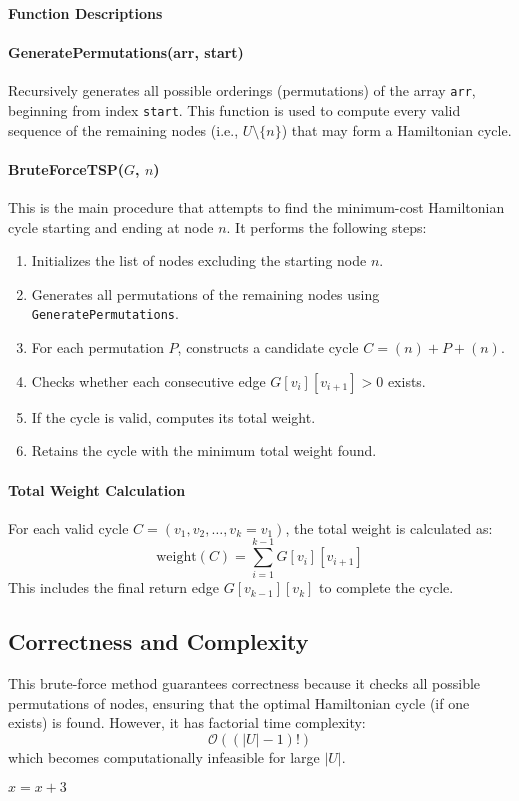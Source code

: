 \pagebreak
\textbf{Function Descriptions}

\paragraph{GeneratePermutations(arr, start)} 
Recursively generates all possible orderings (permutations) of the array \texttt{arr}, beginning from index \texttt{start}. This function is used to compute every valid sequence of the remaining nodes (i.e., $U \setminus \{n\}$) that may form a Hamiltonian cycle.

\paragraph{BruteForceTSP($G$, $n$)} 
This is the main procedure that attempts to find the minimum-cost Hamiltonian cycle starting and ending at node $n$. It performs the following steps:

\begin{enumerate}
    \item Initializes the list of nodes excluding the starting node $n$.
    \item Generates all permutations of the remaining nodes using \texttt{GeneratePermutations}.
    \item For each permutation $P$, constructs a candidate cycle $C = (n) + P + (n)$.
    \item Checks whether each consecutive edge $G[v_i][v_{i+1}] > 0$ exists.
    \item If the cycle is valid, computes its total weight.
    \item Retains the cycle with the minimum total weight found.
\end{enumerate}

\paragraph{Total Weight Calculation}
For each valid cycle $C = (v_1, v_2, \ldots, v_k = v_1)$, the total weight is calculated as:
\[
\text{weight}(C) = \sum_{i=1}^{k-1} G[v_i][v_{i+1}]
\]
This includes the final return edge $G[v_{k-1}][v_k]$ to complete the cycle.

\subsection*{Correctness and Complexity}

This brute-force method guarantees correctness because it checks all possible permutations of nodes, ensuring that the optimal Hamiltonian cycle (if one exists) is found. However, it has factorial time complexity:
\[
\mathcal{O}((|U| - 1)!)
\]
which becomes computationally infeasible for large $|U|$.

\begin{center}
    $x = x+3$
\end{center}
